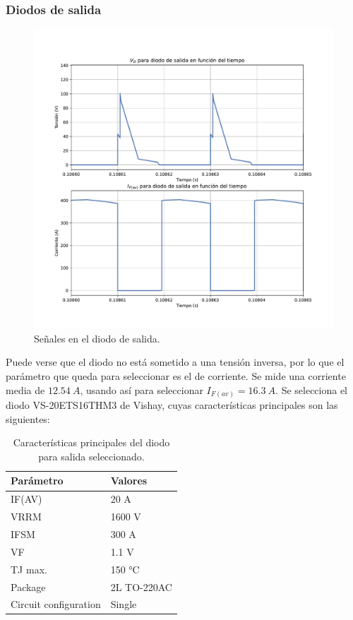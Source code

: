 \subsubsection{Diodos de salida}

\begin{figure}
	\centering
	\includegraphics[width=0.8\linewidth]{img/diodo_salida}
	\caption{Señales en el diodo de salida.}
	\label{fig:diodosalida}
\end{figure}

Puede verse que el diodo no está sometido a una tensión inversa, por lo que el parámetro que queda para seleccionar es el de corriente. Se mide una corriente media de $12.54 \ A$, usando así para seleccionar $I_{F(av)}=16.3 \ A$. Se selecciona el diodo VS-20ETS16THM3 de Vishay, cuyas características principales son las siguientes:

\begin{table}[h]
	\begin{tabular}{|l|l|}
		\hline
		\textbf{Parámetro} & \textbf{Valores} \\
		\hline
		IF(AV) & 20 A \\
		\hline
		VRRM & 1600 V \\
		\hline
		IFSM  & 300 A \\
		\hline
		VF & 1.1 V \\
		\hline
		TJ max. & 150 °C \\
		\hline
		Package & 2L TO-220AC \\
		\hline
		Circuit configuration & Single \\
		\hline
	\end{tabular}
	\caption{Características principales del diodo para salida seleccionado.}
\end{table}

